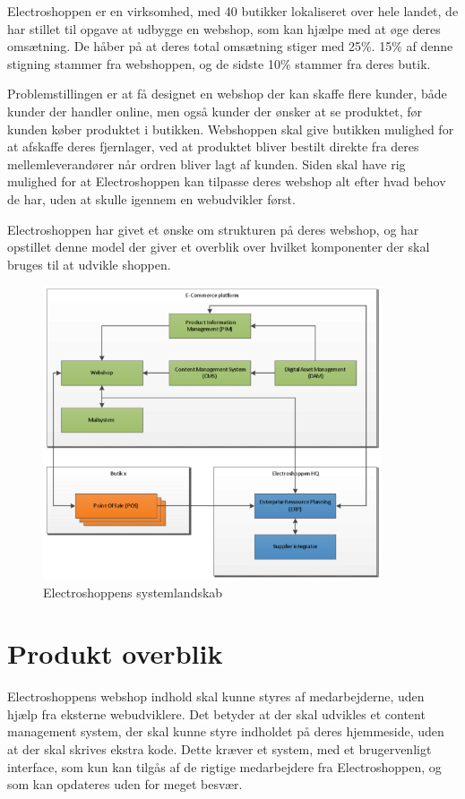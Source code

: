 
Electroshoppen er en virksomhed, med 40 butikker lokaliseret over hele landet, de har stillet til opgave at udbygge en webshop, som kan hjælpe med at øge deres omsætning. De håber på at deres total omsætning stiger med 25\%. 15\% af denne stigning stammer fra webshoppen, og de sidste 10\% stammer fra deres butik. 

Problemstillingen er at få designet en webshop der kan skaffe flere kunder, både kunder der handler online, men også kunder der ønsker at se produktet, før kunden køber produktet i butikken. Webshoppen skal give butikken mulighed for at afskaffe deres fjernlager, ved at produktet bliver bestilt direkte fra deres mellemleverandører når ordren bliver lagt af kunden. Siden skal have rig mulighed for at Electroshoppen kan tilpasse deres webshop alt efter hvad behov de har, uden at skulle igennem en webudvikler først.

Electroshoppen har givet et ønske om strukturen på deres webshop, og har opstillet denne model der giver et overblik over hvilket komponenter der skal bruges til at udvikle shoppen.

\begin{figure}
  \includegraphics[width=10cm]{inceptionsdokumentet/figurer/Electroshoppens-Systemlandskab.png}
  \caption{Electroshoppens systemlandskab}
  \label{fig:ElectroshoppensSystemlandskab}
\end{figure}

\section{Produkt overblik}
Electroshoppens webshop indhold skal kunne styres af medarbejderne, uden hjælp fra eksterne webudviklere. Det betyder at der skal udvikles et content management system, der skal kunne styre indholdet på deres hjemmeside, uden at der skal skrives ekstra kode. Dette kræver et system, med et brugervenligt interface, som kun kan tilgås af de rigtige medarbejdere fra Electroshoppen, og som kan opdateres uden for meget besvær.

